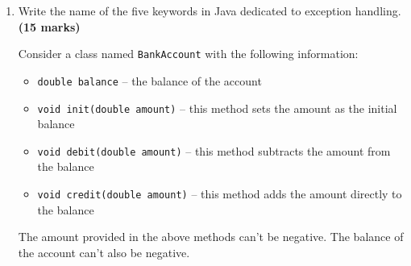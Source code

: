 \documentclass[12pt,a3paper]{article}
\newcommand{\mk}[1]{\textcolor{orange!70!black}{\small\textbf{(#1 marks)}}}
\begin{document}
\begin{enumerate}
\begin{tcolorbox}
\begin{lstlisting}[language=Java]
class InsufficientBalanceException extends Exception {
    InsufficientBalanceException(double needed, double available) {
        super("Need " + needed + " but only " + available + " available");
    }
}

class BankAccount {
    private String owner;
    private double balance;

    BankAccount(String owner, double initialBalance)
            throws InvalidAmountException {
        if (initialBalance < 0)
            throw new InvalidAmountException(initialBalance);
        this.owner   = owner;
        this.balance = initialBalance;
    }

    void deposit(double amt) throws InvalidAmountException {
        if (amt <= 0) throw new InvalidAmountException(amt);
        balance += amt;
    }

    void withdraw(double amt)
            throws InvalidAmountException, InsufficientBalanceException {
        if (amt <= 0) throw new InvalidAmountException(amt);
        if (amt > balance)
            throw new InsufficientBalanceException(amt, balance);
        balance -= amt;
    }

    double getBalance() { return balance; }

    public static void main(String[] args) {
        try {
            BankAccount acc = new BankAccount("Alice", 500);
            acc.deposit(200);
            System.out.println("Balance: " + acc.getBalance()); // 700
            acc.withdraw(900); // throws InsufficientBalanceException
        } catch (InvalidAmountException e) {
            System.out.println("Invalid: " + e.getMessage());
        } catch (InsufficientBalanceException e) {
            System.out.println("Insufficient: " + e.getMessage());
        }
    }
}
\end{lstlisting}
\end{tcolorbox}



\item Write the name of the five keywords in Java dedicated to exception handling. \mk{15}

Consider a class named \texttt{BankAccount} with the following information:
\begin{itemize}
    \item \texttt{double balance} -- the balance of the account
    \item \texttt{void init(double amount)} -- this method sets the amount as the initial balance
    \item \texttt{void debit(double amount)} -- this method subtracts the amount from the balance
    \item \texttt{void credit(double amount)} -- this method adds the amount directly to the balance
\end{itemize}
The amount provided in the above methods can't be negative. The balance of the account can't also be negative.


\end{enumerate}
\end{document}
